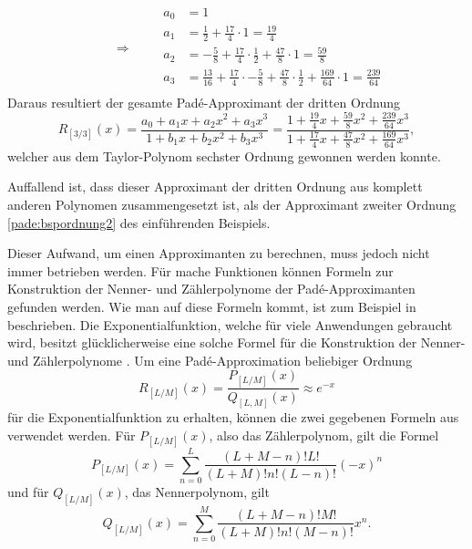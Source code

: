\begin{beispiel}
\begin{equation}
\qquad\Rightarrow\qquad
\begin{aligned}
a_{0}&=1 \\
a_{1}&=\frac{1}{2}+\frac{17}{4} \cdot 1 = \frac{19}{4}\\
a_{2}&=-\frac{5}{8} +\frac{17}{4}\cdot \frac{1}{2} +\frac{47}{8} \cdot 1 = \frac{59}{8} \\
a_{3}&=\frac{13}{16}+\frac{17}{4}\cdot -\frac{5}{8} + \frac{47}{8}\cdot \frac{1}{2} + \frac{169}{64} \cdot 1 = \frac{239}{64}\\
\end{aligned}
\end{equation}
Daraus resultiert der gesamte Padé-Approximant der dritten Ordnung
\begin{equation}
R_{[3/ 3]}(x)
=
\frac{a_0+a_1x+a_2 x^2+a_3x^3}
{1+b_1x+b_2 x^2+b_3 x^3}
=
\frac{\displaystyle1+\frac{19}{4}x+\frac{59}{8}x^2+\frac{239}{64}x^3}
{\displaystyle1+\frac{17}{4}x+\frac{47}{8}x^2+\frac{169}{64}x^3},
\end{equation}
welcher aus dem Taylor-Polynom sechster Ordnung gewonnen werden konnte.

Auffallend ist, dass dieser Approximant der dritten Ordnung aus komplett
anderen Polynomen zusammengesetzt ist, als der Approximant zweiter Ordnung
\eqref{pade:bspordnung2}
des einführenden Beispiels.
\end{beispiel}

Dieser Aufwand, um einen Approximanten zu berechnen, muss jedoch nicht immer betrieben werden.
Für mache Funktionen können Formeln zur Konstruktion der Nenner- und
Zählerpolynome der Padé-Approximanten gefunden werden.
%
Wie man auf diese Formeln kommt, ist zum Beispiel in \cite{pade:Baker2009} beschrieben.
Die Exponentialfunktion, welche für viele Anwendungen gebraucht
wird, besitzt glücklicherweise eine solche Formel für die Konstruktion
der Nenner- und Zählerpolynome \cite{pade:moler}.
Um eine  Padé-Approximation beliebiger Ordnung
\begin{equation}
R_{[L/M]}(x)
=
\frac{P_{[L/ M]}(x)}{Q_{[L, M]}(x)} \approx e^{-x}
\end{equation}
für die Exponentialfunktion zu erhalten,
können die zwei gegebenen Formeln aus \cite{pade:moler} verwendet werden.
Für $P_{[L/ M]}(x)$, also das Zählerpolynom, gilt die Formel
\begin{equation}
P_{[L/ M]}(x)
=
\sum_{n=0}^{L} \frac{(L+M-n) ! L !}{(L+M) ! n !(L-n) !}(-x)^{n}
\label{pade:expP}
\end{equation}
und für $Q_{[L/ M]}(x)$, das Nennerpolynom, gilt
\begin{equation}
Q_{[L/ M]}(x)
=
\sum_{n=0}^{M} \frac{(L+M-n) ! M !}{(L+M) ! n !(M-n) !} x^{n}.
\label{pade:expQ}
\end{equation}

